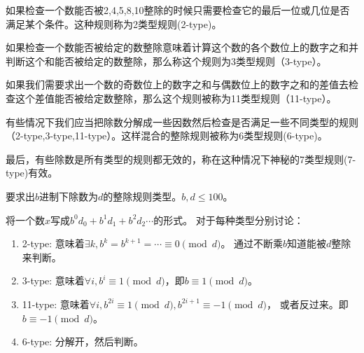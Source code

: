 \begin{prob}
	如果检查一个数能否被2,4,5,8,10整除的时候只需要检查它的最后一位或几位是否满足某个条件。这种规则称为2类型规则(2-type)。\par
	如果检查一个数能否被给定的数整除意味着计算这个数的各个数位上的数字之和并判断这个和能否被给定的数整除，那么称这个规则为3类型规则（3-type）。\par
	如果我们需要求出一个数的奇数位上的数字之和与偶数位上的数字之和的差值去检查这个差值能否被给定数整除，那么这个规则被称为11类型规则（11-type）。\par
	有些情况下我们应当把除数分解成一些因数然后检查是否满足一些不同类型的规则（2-type,3-type,11-type）。这样混合的整除规则被称为6类型规则(6-type)。 \par
	最后，有些除数是所有类型的规则都无效的，称在这种情况下神秘的7类型规则(7-type)有效。\par
	要求出$b$进制下除数为$d$的整除规则类型。$b,d \le 100$。
\end{prob}

\begin{sol}
	将一个数$x$写成$b^0 d_0 + b^1 d_1 + b^2 d_2 \cdots$的形式。
	对于每种类型分别讨论：
	\begin{enumerate}
		\item 2-type: 意味着$\exists k, b^k = b^{k+1} = \cdots \equiv 0 \pmod d$。
			通过不断乘$b$知道能被$d$整除来判断。
		\item 3-type: 意味着$\forall i, b^i \equiv 1 \pmod d$，即$b \equiv 1 \pmod d$。
		\item 11-type: 意味着$\forall i, b^{2i} \equiv 1 \pmod d, b^{2i+1} \equiv -1 \pmod d$，
			或者反过来。即$b \equiv -1 \pmod d$。
		\item 6-type: 分解开，然后判断。
	\end{enumerate}
\end{sol}
